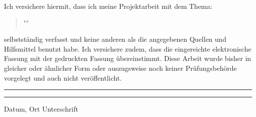 Ich versichere hiermit, dass ich meine Projektarbeit mit dem Thema:    \begin{quote}
"\ThesisTitle "
\end{quote} selbstständig verfasst und keine anderen als die angegebenen Quellen und Hilfsmittel benutzt habe. Ich versichere zudem, dass die eingereichte elektronische Fassung mit der
gedruckten Fassung übereinstimmt.
Diese Arbeit wurde bisher in gleicher oder ähnlicher Form oder auszugsweise
noch keiner Prüfungsbehörde vorgelegt und auch nicht veröffentlicht.

\vspace{50pt} 
\noindent\rule{5cm}{.4pt}\hfill\rule{5cm}{.4pt}\par 
\noindent Datum, Ort \hfill Unterschrift 